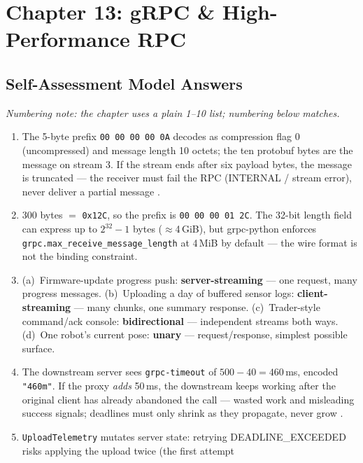 \section{Chapter 13: gRPC \& High-Performance RPC}
\label{sec:sol-ch13}

\subsection{Self-Assessment Model Answers}

\emph{Numbering note: the chapter uses a plain 1--10 list; numbering below
matches.}

\begin{enumerate}[leftmargin=2.2em]
  \item The 5-byte prefix \texttt{00 00 00 00 0A} decodes as compression
    flag 0 (uncompressed) and message length 10 octets; the ten protobuf
    bytes are the message on stream 3. If the stream ends after six payload
    bytes, the message is truncated --- the receiver must fail the RPC
    (INTERNAL / stream error), never deliver a partial message
    \cite{grpcdocs}.
  \item 300 bytes $=$ \texttt{0x12C}, so the prefix is \texttt{00 00 00 01
    2C}. The 32-bit length field can express up to $2^{32}-1$ bytes
    ($\approx$4\,GiB), but grpc-python enforces
    \texttt{grpc.max\_receive\_message\_length} at 4\,MiB by default ---
    the wire format is not the binding constraint.
  \item (a)~Firmware-update progress push: \textbf{server-streaming} --- one
    request, many progress messages. (b)~Uploading a day of buffered sensor
    logs: \textbf{client-streaming} --- many chunks, one summary response.
    (c)~Trader-style command/ack console: \textbf{bidirectional} ---
    independent streams both ways. (d)~One robot's current pose:
    \textbf{unary} --- request/response, simplest possible surface.
  \item The downstream server sees \texttt{grpc-timeout} of $500 - 40 =
    460$\,ms, encoded \texttt{"460m"}. If the proxy \emph{adds} 50\,ms, the
    downstream keeps working after the original client has already
    abandoned the call --- wasted work and misleading success signals;
    deadlines must only shrink as they propagate, never grow
    \cite{grpcdocs}.
  \item \texttt{UploadTelemetry} mutates server state: retrying
    DEADLINE\_EXCEEDED risks applying the upload twice (the first attempt

\end{enumerate}

